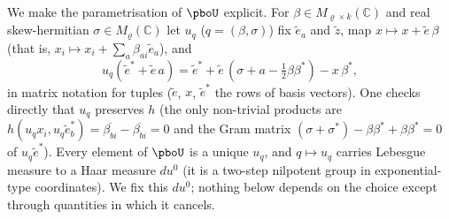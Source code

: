 \documentclass[10pt]{amsart}
\theoremstyle{definition}
\theoremstyle{remark}
\newcommand{\C}{\mathbb C}
\providecommand{\aubar}[1]{\overline{#1}}
\begin{document}
We make the parametrisation of $\pboU$ explicit. For $\beta\in M_{\varrho\times k}(\C)$ and real
skew-hermitian $\sigma\in M_\varrho(\C)$ let $u_q$ ($q=(\beta,\sigma)$) fix $\tilde e_a$ and $\tilde z$, map
$x\mapsto x+\tilde e\,\beta$ (that is, $x_i\mapsto x_i+\sum_a\beta_{ai}\tilde e_a$), and
\begin{equation}\label{pbo:eq-uq}
u_q(\tilde e^*+\tilde e\,a)=\tilde e^*+\tilde e\,(\sigma+a-\tfrac12\beta\beta^*)-x\,\beta^*,
\end{equation}
in matrix notation for tuples ($\tilde e$, $x$, $\tilde e^*$ the rows of basis vectors). One checks directly
that $u_q$ preserves $h$ (the only non-trivial products are $h(u_qx_i,u_q\tilde e^*_b)=\aubar{\beta_{bi}}-\aubar{\beta_{bi}}=0$
and the Gram matrix $(\sigma+\sigma^*)-\beta\beta^*+\beta\beta^*=0$ of $u_q\tilde e^*$). Every element of $\pboU$ is a unique $u_q$, and $q\mapsto u_q$ carries
Lebesgue measure to a Haar measure $du^0$ (it is a two-step nilpotent group in exponential-type
coordinates). We fix this $du^0$; nothing below depends on the choice except through quantities in
which it cancels.
\end{document}

